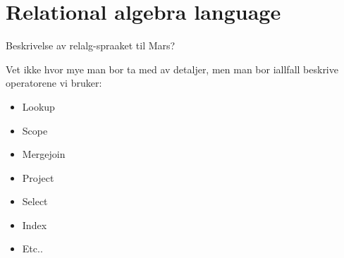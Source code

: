 \section{Relational algebra language}
Beskrivelse av relalg-spraaket til Mars?

Vet ikke hvor mye man bor ta med av detaljer, men man bor iallfall beskrive
operatorene vi bruker:

\begin{itemize}
  \item Lookup
  \item Scope
  \item Mergejoin
  \item Project
  \item Select
  \item Index
  \item Etc..
\end{itemize}


